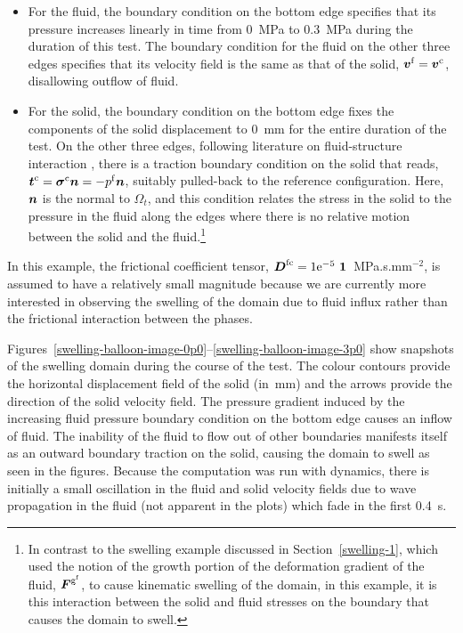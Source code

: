 \begin{itemize}
\item For the fluid, the boundary condition on the bottom edge
  specifies that its pressure increases linearly in time from 0~MPa to
  0.3~MPa during the duration of this test. The boundary condition for
  the fluid on the other three edges specifies that its velocity field
  is the same as that of the solid, $\mbox{\boldmath$ v$}^{\mathrm{f}} =
  \mbox{\boldmath$ v$}^{\mathrm{c}}$, disallowing outflow of fluid.
\item For the solid, the boundary condition on the bottom edge fixes
  the components of the solid displacement to 0~mm for the entire
  duration of the test. On the other three edges, following literature
  on fluid-structure interaction \citep{doneaetal2004}, there is a
  traction boundary condition on the solid that reads,
  $\mbox{\boldmath$ t$}^{\mathrm{c}}=\mbox{\boldmath$\sigma$}^{\mathrm{c}} \mbox{\boldmath$ n$} = -p^{\mathrm{f}} \mbox{\boldmath$ n$}$,
  suitably pulled-back to the reference configuration. Here, $\mbox{\boldmath$ n$}$ is
  the normal to $\Omega_{t}$, and this condition relates the stress in
  the solid to the pressure in the fluid along the edges where there
  is no relative motion between the solid and the fluid.\footnote{In
    contrast to the swelling example discussed in
    Section~\ref{swelling-1}, which used the notion of the growth
    portion of the deformation gradient of the fluid,
    $\mbox{\boldmath$ F$}^{\mathrm{g}^\mathrm{f}}$, to cause kinematic swelling of the
    domain, in this example, it is this interaction between the solid
    and fluid stresses on the boundary that causes the domain to
    swell.}
\end{itemize}

In this example, the frictional coefficient tensor, $\bD^{\mathrm{fc}}
= 1\mathrm{e}^{-5} \ \bone$~MPa.s.mm$^{-2}$, is assumed to have a
relatively small magnitude because we are currently more interested in
observing the swelling of the domain due to fluid influx rather than
the frictional interaction between the phases.

Figures~\ref{swelling-balloon-image-0p0}--\ref{swelling-balloon-image-3p0}
show snapshots of the swelling domain during the course of the
test. The colour contours provide the horizontal displacement field of
the solid (in~mm) and the arrows provide the direction of the solid
velocity field. The pressure gradient induced by the increasing fluid
pressure boundary condition on the bottom edge causes an inflow of
fluid. The inability of the fluid to flow out of other boundaries
manifests itself as an outward boundary traction on the solid, causing
the domain to swell as seen in the figures.  Because the computation
was run with dynamics, there is initially a small oscillation in the
fluid and solid velocity fields due to wave propagation in the fluid
(not apparent in the plots) which fade in the first 0.4~s.

